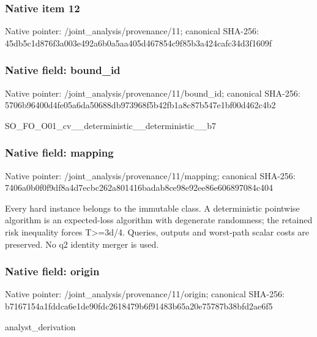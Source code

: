 \documentclass[10pt,a4paper]{article}
\begin{document}
\subsubsection{Native item 12}
Native pointer: /joint\_\allowbreak{}analysis/provenance/11; canonical SHA-256: 45db5c1d876f3a003e492a6b0a5aa405d467854c9f85b3a424cafc34d3f1609f

\subsubsection{Native field: bound\_\allowbreak{}id}
Native pointer: /joint\_\allowbreak{}analysis/provenance/11/bound\_\allowbreak{}id; canonical SHA-256: 5706b96400d4fe05a6da50688db973968f5b42fb1a8c87b547e1bf00d462c4b2

\begingroup\raggedright\sloppy SO\_\allowbreak{}FO\_\allowbreak{}O01\_\allowbreak{}cv\_\allowbreak{}\_\allowbreak{}deterministic\_\allowbreak{}\_\allowbreak{}deterministic\_\allowbreak{}\_\allowbreak{}b7\par\endgroup

\subsubsection{Native field: mapping}
Native pointer: /joint\_\allowbreak{}analysis/provenance/11/mapping; canonical SHA-256: 7406a0b0f0f9df8a4d7ecbc262a801416badab8ce98e92ee86e606897084c404

\begingroup\raggedright\sloppy Every hard instance belongs to the immutable class. A deterministic pointwise algorithm is an expected-loss algorithm with degenerate randomness;\allowbreak{} the retained risk inequality forces T>=\allowbreak{}3d/\allowbreak{}4. Queries,\allowbreak{} outputs and worst-path scalar costs are preserved. No q2 identity merger is used.\par\endgroup

\subsubsection{Native field: origin}
Native pointer: /joint\_\allowbreak{}analysis/provenance/11/origin; canonical SHA-256: b7167154a1fddca6e1de90fdc2618479b6f91483b65a20e75787b38bfd2ae6f5

\begingroup\raggedright\sloppy analyst\_\allowbreak{}derivation\par\endgroup
\end{document}

